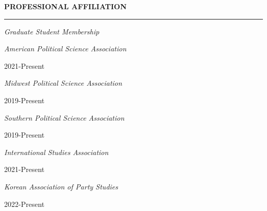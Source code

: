 \documentclass[
  16,
]{article}
\begin{document}
\begin{large}
  {\bf PROFESSIONAL AFFILIATION}
  \vspace{3pt}
  \hrule
  \textit{Graduate Student Membership}
  \end{large}
  \begin{multicols}{2}
    \begin{flushleft}\textit{American Political Science Association}\end{flushleft}
    \begin{flushright}2021-Present\end{flushright}
  \end{multicols}
    \begin{multicols}{2}
    \begin{flushleft}\textit{Midwest Political Science Association}\end{flushleft}
    \begin{flushright}2019-Present\end{flushright}
  \end{multicols}
    \begin{multicols}{2}
    \begin{flushleft}\textit{Southern Political Science Association}\end{flushleft}
    \begin{flushright}2019-Present\end{flushright}
  \end{multicols}
    \begin{multicols}{2}
    \begin{flushleft}\textit{International Studies Association}\end{flushleft}
    \begin{flushright}2021-Present\end{flushright}
  \end{multicols}
    \begin{multicols}{2}
    \begin{flushleft}\textit{Korean Association of Party Studies}\end{flushleft}
    \begin{flushright}2022-Present\end{flushright}
  \end{multicols}
  \vspace{-0.17cm}

\vspace{7pt}
\end{document}
